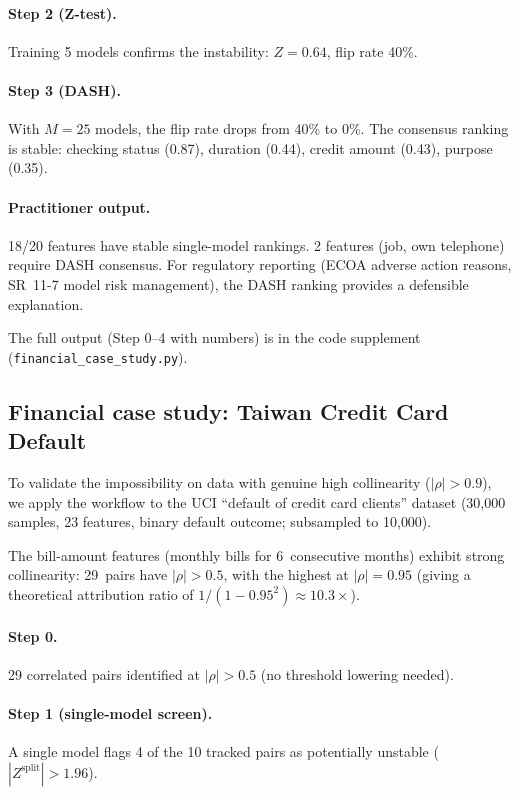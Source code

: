 \documentclass{article}
\begin{document}
\paragraph{Step 2 (Z-test).} Training 5 models confirms the instability:
$Z = 0.64$, flip rate 40\%.

\paragraph{Step 3 (DASH).} With $M = 25$ models, the flip rate drops
from 40\% to 0\%. The consensus ranking is stable: checking status
(0.87), duration (0.44), credit amount (0.43), purpose (0.35).

\paragraph{Practitioner output.} 18/20 features have stable
single-model rankings. 2 features (job, own telephone) require
DASH consensus. For regulatory reporting (ECOA adverse action
reasons, SR~11-7 model risk management), the DASH ranking provides
a defensible explanation.

\begin{sloppypar}
The full output (Step 0--4 with numbers) is in the code supplement (\texttt{financial\_case\_study.py}).
\end{sloppypar}

\subsection{Financial case study: Taiwan Credit Card Default}

To validate the impossibility on data with genuine high collinearity
($|\rho| > 0.9$), we apply the workflow to the UCI ``default of credit
card clients'' dataset (30{,}000 samples, 23 features, binary default
outcome; subsampled to 10{,}000).

The bill-amount features (monthly bills for 6~consecutive months)
exhibit strong collinearity: 29~pairs have $|\rho| > 0.5$, with the
highest at $|\rho| = 0.95$ (giving a theoretical attribution ratio of
$1/(1{-}0.95^2) \approx 10.3\times$).

\paragraph{Step 0.} 29 correlated pairs identified at $|\rho| > 0.5$
(no threshold lowering needed).

\paragraph{Step 1 (single-model screen).} A single model flags 4 of the 10 tracked pairs
as potentially unstable ($|Z^{\text{split}}| > 1.96$).
\end{document}
